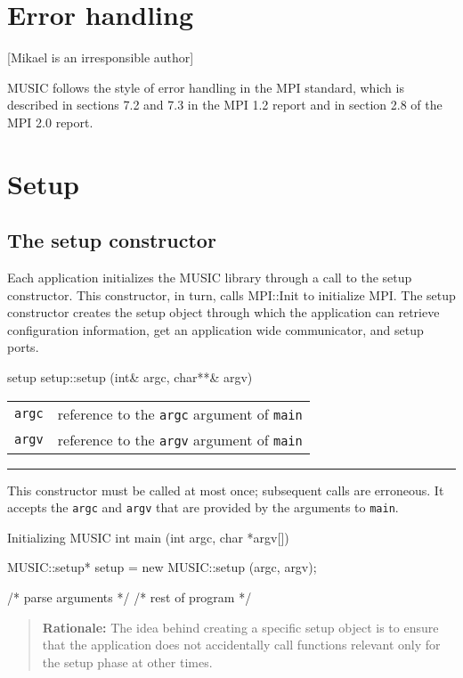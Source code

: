 \documentclass[a4paper]{report}
\makeatletter
\newenvironment{rationale}%
{\par\begin{quote}\textbf{Rationale:}}%
{\par\end{quote}}
\newenvironment{parameters}%
{\begin{tabular}{@{\hspace{2em}}lp{0.6\textwidth}}}%
{\end{tabular}\par\vspace{1mm}\par\hrule\par\vspace{5mm}}
\newcommand{\irresponsible}[1]%
{{\color{red}[#1 is an irresponsible author]}}
\makeatother
\begin{document}
\section{Error handling}
\irresponsible{Mikael}

MUSIC follows the style of error handling in the MPI standard, which
is described in sections 7.2 and 7.3 in the MPI 1.2
report\cite{mpi1.2} and in section 2.8 of the MPI 2.0
report\cite{mpi2.0}.

\section{Setup}

\subsection{The setup constructor}

Each application initializes the MUSIC library through a call to the
setup constructor.  This constructor, in turn, calls
MPI::Init to initialize
MPI.  The setup constructor creates the setup
object through which the application can retrieve configuration
information, get an application wide communicator, and setup ports.

\begin{head}{setup}
  setup::setup (int& argc, char**& argv)
\end{head}
\begin{parameters}
  \lstinline|argc| &%
  reference to the \lstinline|argc| argument of \lstinline|main| \\
  \lstinline|argv| &%
  reference to the \lstinline|argv| argument of \lstinline|main| \\
\end{parameters}

This constructor must be called at most once; subsequent calls are
erroneous.  It accepts the \lstinline|argc| and \lstinline|argv| that are
provided by the arguments to \lstinline|main|.

\begin{code}{Initializing MUSIC}
int main (int argc, char *argv[])
{
  MUSIC::setup* setup = new MUSIC::setup (argc, argv);

  /* parse arguments */
  /* rest of program */
}
\end{code}

\begin{rationale}
  The idea behind creating a specific setup object is to ensure that
  the application does not accidentally call functions relevant only
  for the setup phase at other times.
\end{rationale}
\end{document}
